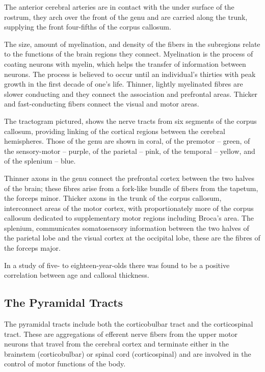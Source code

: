 The anterior cerebral arteries are in contact with the under surface of the rostrum, they arch over the front of the genu and are carried along the trunk, supplying the front four-fifths of the corpus callosum.

The size, amount of myelination, and density of the fibers in the subregions relate to the functions of the brain regions they connect. Myelination is the process of coating neurons with myelin, which helps the transfer of information between neurons. The process is believed to occur until an individual's thirties with peak growth in the first decade of one's life. Thinner, lightly myelinated fibres are slower conducting and they connect the association and prefrontal areas. Thicker and fast-conducting fibers connect the visual and motor areas.

The tractogram pictured, shows the nerve tracts from six segments of the corpus callosum, providing linking of the cortical regions between the cerebral hemispheres. Those of the genu are shown in coral, of the premotor -- green, of the sensory-motor -- purple, of the parietal -- pink, of the temporal -- yellow, and of the splenium -- blue.

Thinner axons in the genu connect the prefrontal cortex between the two halves of the brain; these fibres arise from a fork-like bundle of fibers from the tapetum, the forceps minor. Thicker axons in the trunk of the corpus callosum, interconnect areas of the motor cortex, with proportionately more of the corpus callosum dedicated to supplementary motor regions including Broca's area. The splenium, communicates somatosensory information between the two halves of the parietal lobe and the visual cortex at the occipital lobe, these are the fibres of the forceps major.

In a study of five- to eighteen-year-olds there was found to be a positive correlation between age and callosal thickness.

\hypertarget{the-pyramidal-tracts}{%
\subsection{The Pyramidal Tracts}\label{the-pyramidal-tracts}}

The pyramidal tracts include both the corticobulbar tract and the corticospinal tract. These are aggregations of efferent nerve fibers from the upper motor neurons that travel from the cerebral cortex and terminate either in the brainstem (corticobulbar) or spinal cord (corticospinal) and are involved in the control of motor functions of the body.

